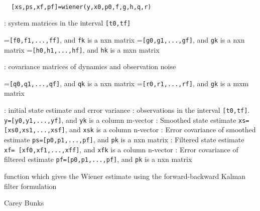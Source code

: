 \begin{mandesc}
   \\ %
\end{mandesc}
\begin{calling_sequence}
\begin{verbatim}
  [xs,ps,xf,pf]=wiener(y,x0,p0,f,g,h,q,r)  
\end{verbatim}
\end{calling_sequence}
\begin{parameters}
  \begin{varlist}
    : system matrices in the interval \verb![t0,tf]!
    \begin{varlist}
       =\verb![f0,f1,...,ff]!, and \verb!fk! is a nxn matrix
       =\verb![g0,g1,...,gf]!, and \verb!gk! is a nxn matrix
       =\verb![h0,h1,...,hf]!, and \verb!hk! is a mxn matrix
    \end{varlist}
    : covariance matrices of dynamics and observation noise
    \begin{varlist}
       =\verb![q0,q1,...,qf]!, and \verb!qk! is a nxn matrix
       =\verb![r0,r1,...,rf]!, and \verb!gk! is a mxm matrix
    \end{varlist}
    : initial state estimate and error variance
    : observations in the interval \verb![t0,tf]!. \verb!y=[y0,y1,...,yf]!, and \verb!yk! is a column m-vector
    : Smoothed state estimate \verb!xs= [xs0,xs1,...,xsf]!, and \verb!xsk! is a column n-vector
    : Error covariance of smoothed estimate \verb!ps=[p0,p1,...,pf]!, and \verb!pk! is a nxn matrix
    : Filtered state estimate \verb!xf= [xf0,xf1,...,xff]!, and \verb!xfk! is a column n-vector
    : Error covariance of filtered estimate \verb!pf=[p0,p1,...,pf]!, and \verb!pk! is a nxn matrix
  \end{varlist}
\end{parameters}
\begin{mandescription}
  function which gives the Wiener estimate using
  the forward-backward Kalman filter formulation
\end{mandescription}
\begin{authors}
  Carey Bunks
\end{authors}
